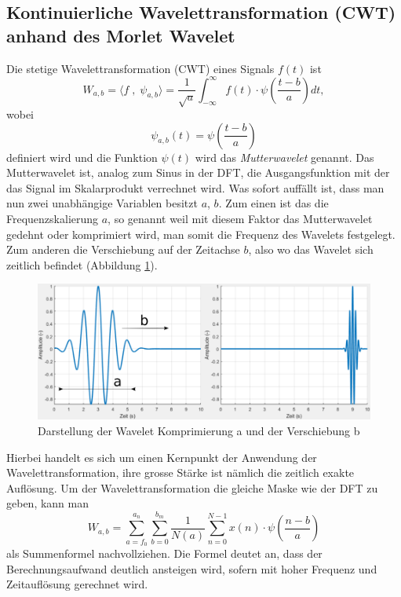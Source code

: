 \subsection{Kontinuierliche Wavelettransformation (CWT) anhand des Morlet
Wavelet
	\label{wavelets:subsection:CWT}}
Die stetige Wavelettransformation (CWT) eines Signals $f(t)$ ist
\cite{wavelets:H.Burkhardt.2020}
\begin{equation}
	W_{a,b}=\langle f \; , \; \psi_{a,b} \rangle = \frac{1}{\sqrt{a}}\int_{-\infty}^{\infty} f(t)\cdot\psi\left(\frac{t-b}{a}\right) dt,
	\label{wavelets:equation3}
\end{equation}
wobei
\[
\psi_{a,b}(t)=\psi\left(\frac{t-b}{a}\right)
\]
definiert wird und die Funktion $\psi(t)$ wird das {\em Mutterwavelet}
genannt. Das Mutterwavelet ist, analog zum Sinus in der DFT, die
Ausgangsfunktion mit der das Signal im Skalarprodukt verrechnet
wird.
Was sofort auffällt ist, dass man nun zwei unabhängige Variablen
besitzt $a$, $b$.
Zum einen ist das die Frequenzskalierung $a$, so
genannt weil mit diesem Faktor das Mutterwavelet gedehnt oder
komprimiert wird, man somit die Frequenz des Wavelets festgelegt.
Zum anderen die Verschiebung auf der Zeitachse $b$, also wo das
Wavelet sich zeitlich befindet (Abbildung
\ref{wavelet:fig:5_WaveletKompUndShift}).

\begin{figure}
	\centering
	\includegraphics[width=\textwidth]{papers/wavelets/images/5_WaveletKompUndShift.png}
	\caption{Darstellung der Wavelet Komprimierung a und der Verschiebung b}
	\label{wavelet:fig:5_WaveletKompUndShift}
\end{figure}%

Hierbei handelt es sich um einen Kernpunkt der Anwendung der
Wavelettransformation, ihre grosse Stärke ist nämlich die zeitlich
exakte Auflösung. Um der Wavelettransformation die gleiche Maske
wie der DFT zu geben, kann man
\begin{equation}
	W_{a,b}=\sum_{a=f_0}^{a_n}\sum_{b=0}^{b_m}\frac{1}{N(a)}\sum_{n=0}^{N-1} x(n)\cdot\psi\left(\frac{n-b}{a}\right)
	\label{wavelets:equation4}
\end{equation}
als Summenformel nachvollziehen.
Die Formel deutet an, dass der Berechnungsaufwand deutlich ansteigen wird,
sofern mit hoher Frequenz und Zeitauflösung gerechnet wird.

